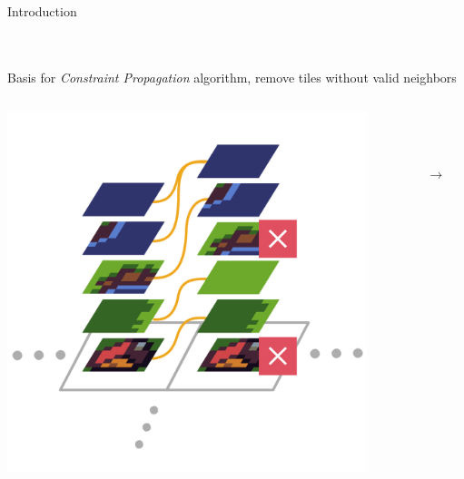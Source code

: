 \documentclass{beamer}
\begin{document}
  \begin{frame}[fragile]{Introduction}

    \hfill \\
    \hfill \\

    Basis for \textit{Constraint Propagation} algorithm,
    remove tiles without valid neighbors

    \begin{columns}[T,onlytextwidth]
        \begin{block}{}
          \includegraphics[width=0.9\textwidth]{figs/ac_illustration_inconsistent.pdf}
        \end{block}
        \begin{block}{}
          \begin{centering}
          \hfill \\
          \hfill \\
          \hfill \\
            $\boldsymbol{\to}$
          \end{centering}
        \end{block}
        \begin{block}{}

\end{block}
\end{columns}
\end{frame}
\end{document}

